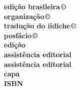 \newcommand{\linha}[2]{\ifdef{#2}{\linhalayout{#1}{#2}}{}}

\begingroup\tiny
\parindent=0cm
\thispagestyle{empty}

\textbf{edição brasileira\,©}\\

\textbf{organização\,©}\\
\textbf{tradução do iídiche\,©}\\
\textbf{posfácio\,©}\\


\textbf{edição}\\
\textbf{assistência editorial}\\
\textbf{assistência editorial}\\
\textbf{capa}\\

\textbf{ISBN}\smallskip

\vfill

